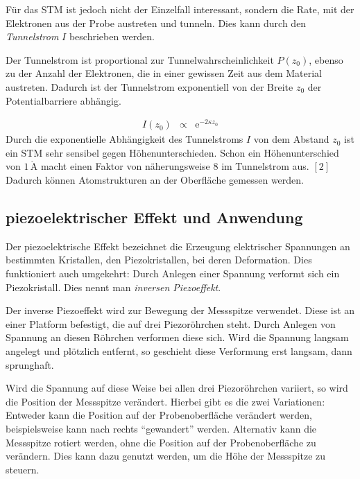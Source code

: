 \documentclass[12pt,a4paper]{scrartcl}
\numberwithin{equation}{section} %
\renewcommand{\[}{} %
\renewcommand{\]}{\noindent} %
\begin{document}
Für das STM ist jedoch nicht der Einzelfall interessant, sondern die
Rate, mit der Elektronen aus der Probe austreten und tunneln. Dies kann
durch den \emph{Tunnelstrom} \(I\) beschrieben werden.

Der Tunnelstrom ist proportional zur Tunnelwahrscheinlichkeit
\(P(z_0)\), ebenso zu der Anzahl der Elektronen, die in einer gewissen
Zeit aus dem Material austreten. Dadurch ist der Tunnelstrom
exponentiell von der Breite \(z_0\) der Potentialbarriere abhängig.

\[
\begin{eqnarray}
    I(z_0) &\propto& \mathrm e^{-2\kappa z_0} \label{I(z)}
\end{eqnarray}
\] Durch die exponentielle Abhängigkeit des Tunnelstroms \(I\) von dem
Abstand \(z_0\) ist ein STM sehr sensibel gegen Höhenunterschieden.
Schon ein Höhenunterschied von \(1\,\mathrm{\mathring{A}}\) macht einen
Faktor von näherungsweise \(8\) im Tunnelstrom aus. \([2]\) Dadurch
können Atomstrukturen an der Oberfläche gemessen werden.

\hypertarget{piezoelektrischer-effekt-und-anwendung}{%
\subsection{piezoelektrischer Effekt und
Anwendung}\label{piezoelektrischer-effekt-und-anwendung}}

Der piezoelektrische Effekt bezeichnet die Erzeugung elektrischer
Spannungen an bestimmten Kristallen, den Piezokristallen, bei deren
Deformation. Dies funktioniert auch umgekehrt: Durch Anlegen einer
Spannung verformt sich ein Piezokristall. Dies nennt man \emph{inversen
Piezoeffekt}.

Der inverse Piezoeffekt wird zur Bewegung der Messspitze verwendet.
Diese ist an einer Platform befestigt, die auf drei Piezoröhrchen steht.
Durch Anlegen von Spannung an diesen Röhrchen verformen diese sich. Wird
die Spannung langsam angelegt und plötzlich entfernt, so geschieht diese
Verformung erst langsam, dann sprunghaft.

Wird die Spannung auf diese Weise bei allen drei Piezoröhrchen variiert,
so wird die Position der Messspitze verändert. Hierbei gibt es die zwei
Variationen: Entweder kann die Position auf der Probenoberfläche
verändert werden, beispielsweise kann nach rechts ``gewandert'' werden.
Alternativ kann die Messspitze rotiert werden, ohne die Position auf der
Probenoberfläche zu verändern. Dies kann dazu genutzt werden, um die
Höhe der Messspitze zu steuern.
\end{document}
